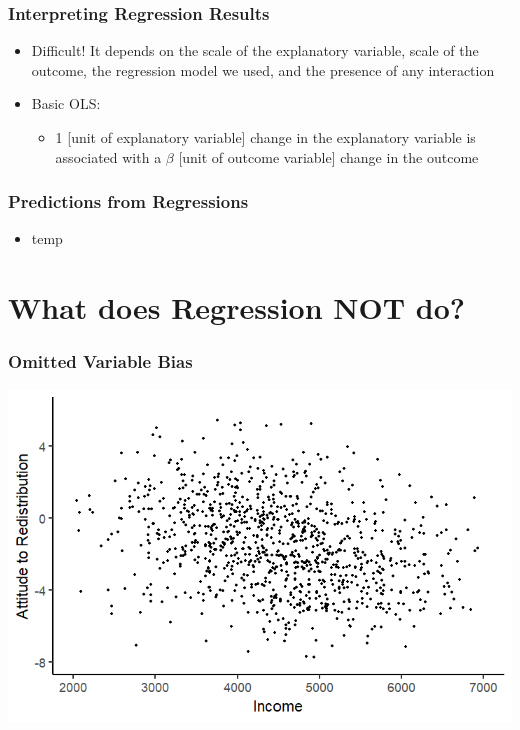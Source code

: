 \documentclass[xcolor=x11names,compress]{beamer}\usepackage[]{graphicx}\usepackage[]{color}
\makeatletter
\def\maxwidth{ %
  \ifdim\Gin@nat@width>\linewidth
    \linewidth
  \else
    \Gin@nat@width
  \fi
}
\newenvironment{knitrout}{}{} %
\renewcommand{\(}{\begin{columns}}
\renewcommand{\)}{\end{columns}}
\newcommand{\<}[1]{\begin{column}{#1}}
\renewcommand{\>}{\end{column}}
\makeatother
\begin{document}
\begin{frame}
\frametitle{Interpreting Regression Results}
\begin{itemize}
\item Difficult! It depends on the scale of the explanatory variable, scale of the outcome, the regression model we used, and the presence of any interaction
\item Basic OLS:
\begin{itemize}
\item 1 [unit of explanatory variable] change in the explanatory variable is associated with a $\beta$ [unit of outcome variable] change in the outcome
\end{itemize}
\end{itemize}
\end{frame}

\begin{frame}
\frametitle{Predictions from Regressions}
\begin{itemize}
\item temp
\end{itemize}
\end{frame}


\section{What does Regression NOT do?}



\begin{frame}
\frametitle{Omitted Variable Bias}
\begin{knitrout}
\color{fgcolor}
\includegraphics[width=\maxwidth]{figure/confound3b-1} 

\end{knitrout}
\end{frame}
\end{document}

